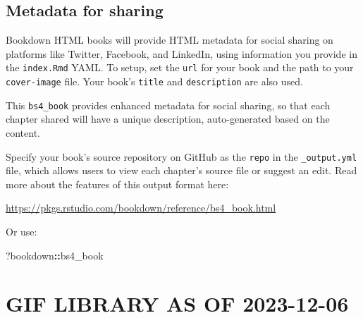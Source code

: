 \documentclass[
]{book}
\makeatletter
\newenvironment{Shaded}{\begin{snugshade}}{\end{snugshade}}
\newcommand{\NormalTok}[1]{#1}
\newcommand{\SpecialCharTok}[1]{\textcolor[rgb]{0.81,0.36,0.00}{\textbf{#1}}}
\newenvironment{kframe}{%
\medskip{}
\setlength{\fboxsep}{.8em}
 \def\at@end@of@kframe{}%
 \ifinner\ifhmode%
  \def\at@end@of@kframe{\end{minipage}}%
  \begin{minipage}{\columnwidth}%
 \fi\fi%
 \def\FrameCommand##1{\hskip\@totalleftmargin \hskip-\fboxsep
 \colorbox{shadecolor}{##1}\hskip-\fboxsep
     \hskip-\linewidth \hskip-\@totalleftmargin \hskip\columnwidth}%
 \MakeFramed {\advance\hsize-\width
   \@totalleftmargin\z@ \linewidth\hsize
   \@setminipage}}%
 {\par\unskip\endMakeFramed%
 \at@end@of@kframe}
\renewenvironment{Shaded}{\begin{kframe}}{\end{kframe}}
\renewcommand{\NormalTok}  [1]{{#1}}
\makeatother
\begin{document}
\hypertarget{metadata-for-sharing}{%
\section{Metadata for sharing}\label{metadata-for-sharing}}

Bookdown HTML books will provide HTML metadata for social sharing on platforms like Twitter, Facebook, and LinkedIn, using information you provide in the \texttt{index.Rmd} YAML. To setup, set the \texttt{url} for your book and the path to your \texttt{cover-image} file. Your book's \texttt{title} and \texttt{description} are also used.

This \texttt{bs4\_book} provides enhanced metadata for social sharing, so that each chapter shared will have a unique description, auto-generated based on the content.

Specify your book's source repository on GitHub as the \texttt{repo} in the \texttt{\_output.yml} file, which allows users to view each chapter's source file or suggest an edit. Read more about the features of this output format here:

\url{https://pkgs.rstudio.com/bookdown/reference/bs4_book.html}

Or use:

\begin{Shaded}
\begin{Highlighting}[]
\NormalTok{?bookdown}\SpecialCharTok{::}\NormalTok{bs4\_book}
\end{Highlighting}
\end{Shaded}

\hypertarget{gif-library-as-of-2023-12-06}{%
\chapter{GIF LIBRARY AS OF 2023-12-06}\label{gif-library-as-of-2023-12-06}}
\end{document}
